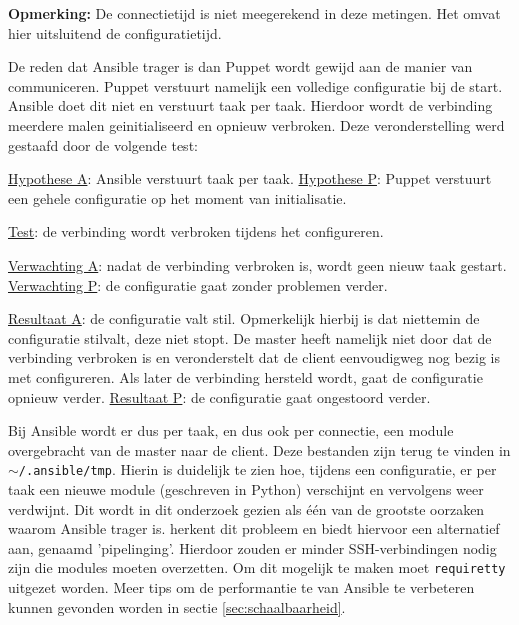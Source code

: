 \textbf{Opmerking:} De \gls{connectietijd} is niet meegerekend in deze metingen. Het omvat hier uitsluitend de \gls{configuratietijd}.

De reden dat Ansible trager is dan Puppet wordt gewijd aan de manier van communiceren. Puppet verstuurt namelijk een volledige configuratie bij de start. Ansible doet dit niet en verstuurt taak per taak. Hierdoor wordt de verbinding meerdere malen geinitialiseerd en opnieuw verbroken. Deze veronderstelling werd gestaafd door de volgende test:

\begin{addmargin}[2em]{0cm}
\underline{Hypothese A}: Ansible verstuurt taak per taak.\newline
\underline{Hypothese P}: Puppet verstuurt een gehele configuratie op het moment van initialisatie.

\underline{Test}: de verbinding wordt verbroken tijdens het configureren.

\underline{Verwachting A}: nadat de verbinding verbroken is, wordt geen nieuw taak gestart.\newline
\underline{Verwachting P}: de configuratie gaat zonder problemen verder.

\underline{Resultaat A}: de configuratie valt stil. Opmerkelijk hierbij is dat niettemin de configuratie stilvalt, deze niet stopt. De master heeft namelijk niet door dat de verbinding verbroken is en veronderstelt dat de client eenvoudigweg nog bezig is met configureren. Als later de verbinding hersteld wordt, gaat de configuratie opnieuw verder.\newline
\underline{Resultaat P}: de configuratie gaat ongestoord verder.
\end{addmargin}

Bij Ansible wordt er dus per taak, en dus ook per connectie, een module overgebracht van de master naar de client. Deze bestanden zijn terug te vinden in \texttt{$\sim$/.ansible/tmp}. Hierin is duidelijk te zien hoe, tijdens een configuratie, er per taak een nieuwe module (geschreven in Python) verschijnt en vervolgens weer verdwijnt. Dit wordt in dit onderzoek gezien als \'e\'en van de grootste oorzaken waarom Ansible trager is.  \textcite{AnsibleTuning} herkent dit probleem en biedt hiervoor een alternatief aan, genaamd 'pipelinging'. Hierdoor zouden er minder SSH-verbindingen nodig zijn die modules moeten overzetten. Om dit mogelijk te maken moet \texttt{requiretty} uitgezet worden. Meer tips om de performantie te van Ansible te verbeteren kunnen gevonden worden in sectie \ref{sec:schaalbaarheid}.

